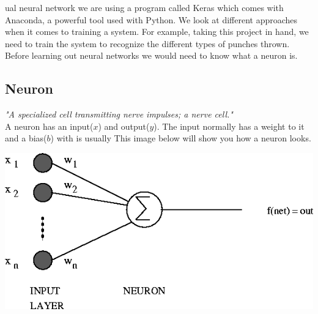 \documentclass[a4paper,12pt,twoside]{report}
\begin{document}
ual neural network we are using a program called Keras which comes with Anaconda, a powerful tool used with Python. We look at different approaches when it comes to training a system. For example, taking this project in hand, we need to train the system to recognize the different types of punches thrown. Before learning out neural networks we would need to know what a neuron is.

\subsection{Neuron}
\textit{"A specialized cell transmitting nerve impulses; a nerve cell."} \\ A neuron has an input($x$) and output($y$). The input normally has a weight to it and a bias($b$) with is usually This image below will show you how a neuron looks.

\begin{center}
\includegraphics[scale=.4]{images/Neuron.png}
\end{center}
\end{document}

